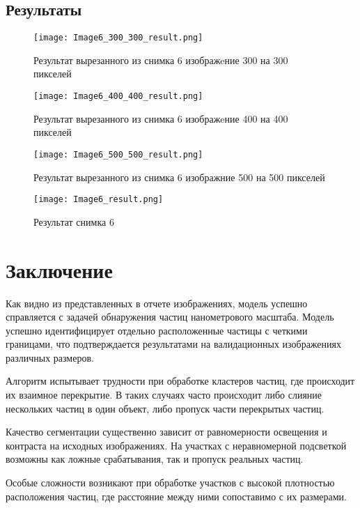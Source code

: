 \documentclass[12pt, a4paper]{report}
\begin{document}
	\subsection*{Результаты}
	\large
	\begin{figure}[H]
		\texttt{[image: Image6\_300\_300\_result.png]}
		\caption{Результат вырезанного из снимка 6 изображeние 300 на 300 пикселей}
	\end{figure}
	\begin{figure}[H]
		\texttt{[image: Image6\_400\_400\_result.png]}
		\caption{Результат вырезанного из снимка 6 изображeние 400 на 400 пикселей}
	\end{figure}
	\begin{figure}[H]
		\texttt{[image: Image6\_500\_500\_result.png]}
		\caption{Результат вырезанного из снимка 6 изображние 500 на 500 пикселей}
	\end{figure}
	\begin{figure}[H]
		\texttt{[image: Image6\_result.png]}
		\caption{Результат снимка 6}
	\end{figure}

	\newpage

	\section*{Заключение}
	\large
	Как видно из представленных в отчете изображениях, модель успешно справляется с задачей обнаружения частиц нанометрового масштаба. Модель успешно идентифицирует отдельно расположенные частицы с четкими границами, что подтверждается результатами на валидационных изображениях различных размеров. \par
	Алгоритм испытывает трудности при обработке кластеров частиц, где происходит их взаимное перекрытие. В таких случаях часто происходит либо слияние нескольких частиц в один объект, либо пропуск части перекрытых частиц. \par
	Качество сегментации существенно зависит от равномерности освещения и контраста на исходных изображениях. На участках с неравномерной подсветкой возможны как ложные срабатывания, так и пропуск реальных частиц. \par
	Особые сложности возникают при обработке участков с высокой плотностью расположения частиц, где расстояние между ними сопоставимо с их размерами.
\end{document}

